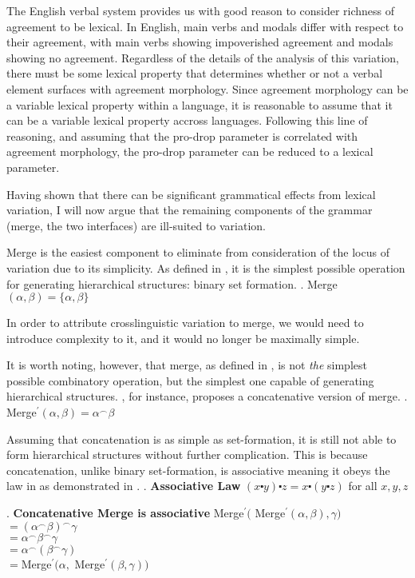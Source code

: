 \documentclass[MilwayThesis]{subfiles}
\begin{document}
The English verbal system provides us with good reason to consider richness of agreement to be lexical.
In English, main verbs and modals differ with respect to their agreement, with main verbs showing impoverished agreement and modals showing no agreement.
Regardless of the details of the analysis of this variation, there must be some lexical property that determines whether or not a verbal element surfaces with agreement morphology.
Since agreement morphology can be a variable lexical property within a language, it is reasonable to assume that it can be a variable lexical property accross languages.
Following this line of reasoning, and assuming that the pro-drop parameter is correlated with agreement morphology, the pro-drop parameter can be reduced to a lexical parameter.

Having shown that there can be significant grammatical effects from lexical variation, I will now argue that the remaining components of the grammar (merge, the two interfaces) are ill-suited to variation.

Merge is the easiest component to eliminate from consideration of the locus of variation due to its simplicity.
As defined in \Next, it is the simplest possible operation for generating hierarchical structures: binary set formation.
\ex. Merge$(\alpha, \beta) = \{ \alpha, \beta\}$

In order to attribute crosslinguistic variation to merge, we would need to introduce complexity to it, and it would no longer be maximally simple.

It is worth noting, however, that merge, as defined in \Last, is not \textit{the} simplest possible combinatory operation, but the simplest one capable of generating hierarchical structures.
\textcite{hornstein2009theory}, for instance, proposes a concatenative version of merge.
\ex. Merge$^\prime(\alpha, \beta) = \alpha^\frown\beta$

Assuming that concatenation is as simple as set-formation, it is still not able to form hierarchical structures without further complication.
This is because concatenation, unlike binary set-formation, is associative meaning it obeys the law in \Next as demonstrated in \NNext.
\ex. \textbf{Associative Law}
$(x \centerdot y) \centerdot z = x \centerdot (y \centerdot z)$ for all $x,y,z$

\ex. \textbf{Concatenative Merge is associative}
Merge$^\prime($ Merge$^\prime(\alpha, \beta), \gamma)$\\
$= (\alpha^\frown\beta)^\frown\gamma$\\
$= \alpha^\frown\beta^\frown\gamma$\\
$= \alpha^\frown(\beta^\frown\gamma)$\\
$= $Merge$^\prime(\alpha, $ Merge$^\prime(\beta, \gamma))$
\end{document}

